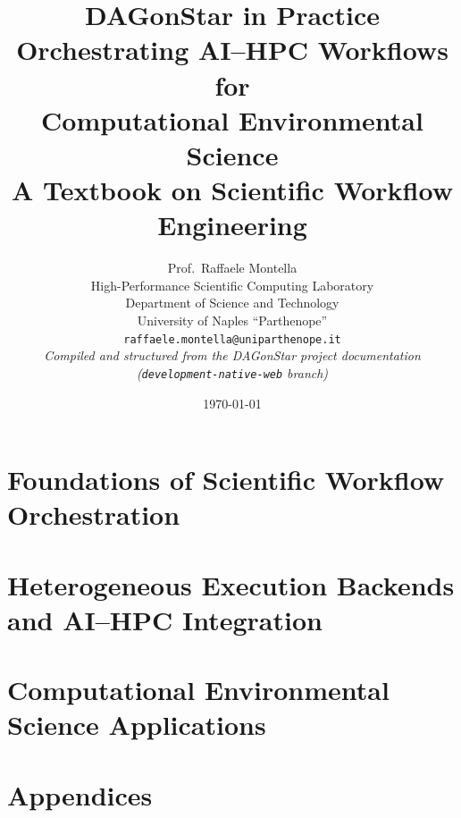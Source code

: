 \documentclass[11pt,twoside,openright]{book}
\title{
  \vspace{-1.5cm}
  {\Huge\bfseries DAGonStar in Practice}\\[0.6em]
  {\Large Orchestrating AI--HPC Workflows for\\ Computational Environmental Science}\\[1.2em]
  {\large A Textbook on Scientific Workflow Engineering}
}
\author{
  Prof.\ Raffaele Montella \\
  \small High-Performance Scientific Computing Laboratory \\
  \small Department of Science and Technology \\
  \small University of Naples ``Parthenope'' \\
  \small \texttt{raffaele.montella@uniparthenope.it} \\[1em]
  \small \textit{Compiled and structured from the DAGonStar project documentation} \\
  \small \textit{(\texttt{development-native-web} branch)}
}
\date{\today}
\theoremstyle{definition}
\begin{document}
\frontmatter
\maketitle


\tableofcontents
\listoffigures
\lstlistoflistings



\mainmatter

\part{Foundations of Scientific Workflow Orchestration}









\part{Heterogeneous Execution Backends and AI--HPC Integration}







\part{Computational Environmental Science Applications}




\appendix
\part{Appendices}





\backmatter

\end{document}
